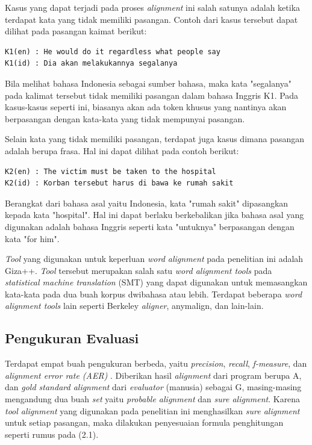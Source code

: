 Kasus yang dapat terjadi pada proses \textit{alignment} ini salah satunya adalah ketika terdapat kata yang tidak memiliki pasangan. Contoh dari kasus tersebut dapat dilihat pada pasangan kaimat berikut:

\begin{lstlisting}
K1(en) : He would do it regardless what people say
K1(id) : Dia akan melakukannya segalanya
\end{lstlisting}


Bila melihat bahasa Indonesia sebagai sumber bahasa, maka kata "segalanya" pada kalimat tersebut tidak memiliki pasangan dalam bahasa Inggris K1. Pada kasus-kasus seperti ini, biasanya akan ada token khusus yang nantinya akan berpasangan dengan kata-kata yang tidak mempunyai pasangan.

Selain kata yang tidak memiliki pasangan, terdapat juga kasus dimana pasangan adalah berupa frasa. Hal ini dapat dilihat pada contoh berikut:

\begin{lstlisting}
K2(en) : The victim must be taken to the hospital
K2(id) : Korban tersebut harus di bawa ke rumah sakit
\end{lstlisting}

Berangkat dari bahasa asal yaitu Indonesia, kata "rumah sakit" dipasangkan kepada kata "hospital". Hal ini dapat berlaku berkebalikan jika bahasa asal yang digunakan adalah bahasa Inggris seperti kata "untuknya" berpasangan dengan kata "for him".

\textit{Tool} yang digunakan untuk keperluan \textit{word alignment} pada penelitian ini adalah Giza++. \textit{Tool} tersebut merupakan salah satu \textit{word alignment tools} pada \textit{statistical machine translation} (SMT) yang dapat digunakan untuk memasangkan kata-kata pada dua buah korpus dwibahasa atau lebih. Terdapat beberapa \textit{word alignment tools} lain seperti Berkeley \textit{aligner}, anymalign, dan lain-lain.

\subsection{Pengukuran Evaluasi}
Terdapat empat buah pengukuran berbeda, yaitu \textit{precision}, \textit{recall}, \textit{f-measure}, dan \textit{alignment error rate (AER)} \citep{mihalcea2003evaluation}. Diberikan hasil \textit{alignment} dari program berupa A, dan \textit{gold standard alignment} dari \textit{evaluator} (manusia) sebagai G, masing-masing mengandung dua buah \textit{set} yaitu \textit{probable alignment} dan \textit{sure alignment}. Karena \textit{tool alignment} yang digunakan pada penelitian ini menghasilkan \textit{sure alignment} untuk setiap pasangan, maka dilakukan penyesuaian formula penghitungan seperti rumus pada (2.1).

